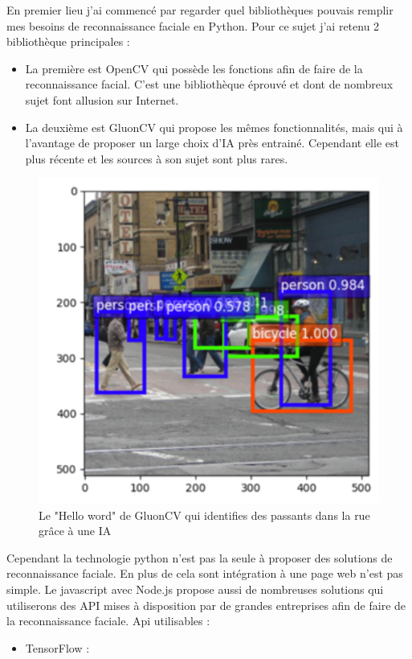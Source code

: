 En premier lieu j’ai commencé par regarder quel bibliothèques pouvais remplir mes besoins de reconnaissance faciale en Python. 
Pour ce sujet j’ai retenu 2 bibliothèque principales :
\begin{itemize}
    \item La première est OpenCV qui possède les fonctions afin de faire de la reconnaissance facial. C’est une bibliothèque éprouvé et dont de nombreux sujet font allusion sur Internet.
    \item La deuxième est GluonCV qui propose les mêmes fonctionnalités, mais qui à l’avantage de proposer un large choix d’IA près entrainé. Cependant elle est plus récente et les sources à son sujet sont plus rares.
\end{itemize}

\begin{figure}[h]
    \centering
    \includegraphics[width=.8\linewidth]{Figures/GluonCV_start.png}
    \caption{Le "Hello word" de GluonCV qui identifies des passants dans la rue grâce à une IA}
\end{figure}

Cependant la technologie python n’est pas la seule à proposer des solutions de reconnaissance faciale. En plus de cela sont intégration à une page web n’est pas simple.
Le javascript avec Node.js propose aussi de nombreuses solutions qui utiliserons des API mises à disposition par de grandes entreprises afin de faire de la reconnaissance faciale.
Api utilisables :
\begin{itemize}
    \item TensorFlow :
\end{itemize}



